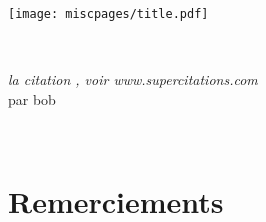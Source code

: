 
\addtocounter{page}{-1}
\thispagestyle{empty}
\begin{center}
\texttt{[image: miscpages/title.pdf]}
\end{center}
\newpage\thispagestyle{empty}\addtocounter{page}{-1}
{} {
~\newpage\thispagestyle{empty}\addtocounter{page}{-1}
\begin{flushright}
  \emph{la citation , voir www.supercitations.com}\\
  par bob
\end{flushright}


\newpage\thispagestyle{empty}\addtocounter{page}{-1}
~\newpage\thispagestyle{empty}\addtocounter{page}{-1}

\section*{Remerciements}
\remerciements

\newpage\thispagestyle{empty}\addtocounter{page}{-1}
}

